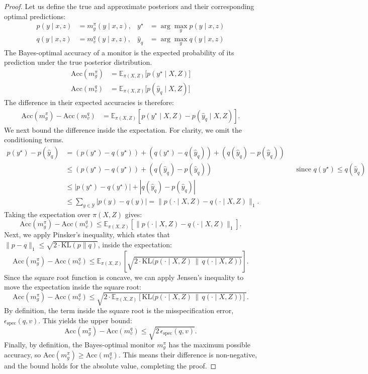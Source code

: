 \documentclass{article}
\theoremstyle{plain}
\begin{document}
\begin{proof}
Let us define the true and approximate posteriors and their corresponding optimal predictions:
\begin{align*}
p(y \mid x,z) &= m_g^{\pi}(y \mid x,z), & y^\star &= \arg\max_{y} p(y \mid x,z) \\
q(y \mid x,z) &= m_v^{q}(y \mid x,z), & \hat{y}_q &= \arg\max_{y} q(y \mid x,z)
\end{align*}
The Bayes-optimal accuracy of a monitor is the expected probability of its prediction under the true posterior distribution.
\begin{align*}
    \mathrm{Acc}(m_g^\pi) &= \mathbb{E}_{\pi(X,Z)}\big[p(y^\star \mid X,Z)\big] \\
    \mathrm{Acc}(m_v^q) &= \mathbb{E}_{\pi(X,Z)}\big[p(\hat{y}_q \mid X,Z)\big]
\end{align*}
The difference in their expected accuracies is therefore:
\begin{align*}
\mathrm{Acc}(m_g^{\pi}) - \mathrm{Acc}(m_v^q) &= \mathbb{E}_{\pi(X,Z)} \left[ p(y^\star\mid X,Z) - p(\hat{y}_q \mid X,Z) \right].
\end{align*}
We next bound the difference inside the expectation. For clarity, we omit the conditioning terms.
\begin{align*}
p(y^\star) - p(\hat{y}_q) &= \left( p(y^\star) - q(y^\star) \right) + \left( q(y^\star) - q(\hat{y}_q) \right) + \left( q(\hat{y}_q) - p(\hat{y}_q) \right) \\
&\le \left( p(y^\star) - q(y^\star) \right) + \left( q(\hat{y}_q) - p(\hat{y}_q) \right) && \text{since } q(y^\star) \le q(\hat{y}_q) \\
&\le |p(y^\star) - q(y^\star)| + |q(\hat{y}_q) - p(\hat{y}_q)| && \\
&\le \sum_{y \in \mathcal{Y}} |p(y) - q(y)| = \| p(\cdot \mid X,Z) - q(\cdot \mid X,Z) \|_1.
\end{align*}
Taking the expectation over $\pi(X,Z)$ gives:
\[
\mathrm{Acc}(m_g^{\pi}) - \mathrm{Acc}(m_v^q) \le \mathbb{E}_{\pi(X,Z)} \left[ \| p(\cdot \mid X,Z) - q(\cdot \mid X,Z) \|_1 \right].
\]
Next, we apply Pinsker's inequality, which states that $\|p-q\|_1 \le \sqrt{2 \cdot \mathrm{KL}(p\|q)}$, inside the expectation:
\[
\mathrm{Acc}(m_g^{\pi}) - \mathrm{Acc}(m_v^q)
\le \mathbb{E}_{\pi(X,Z)} \left[ \sqrt{2 \cdot \mathrm{KL}\big(p(\cdot \mid X,Z) \,\|\, q(\cdot \mid X,Z)\big)} \right].
\]
Since the square root function is concave, we can apply Jensen's inequality to move the expectation inside the square root:
\[
\mathrm{Acc}(m_g^{\pi}) - \mathrm{Acc}(m_v^q)
\le \sqrt{2 \cdot \mathbb{E}_{\pi(X,Z)} \left[ \mathrm{KL}\big(p(\cdot \mid X,Z) \,\|\, q(\cdot \mid X,Z)\big) \right]}.
\]
By definition, the term inside the square root is the misspecification error, $\epsilon_{\mathrm{spec}}(q,v)$. This yields the upper bound:
\[
\mathrm{Acc}(m_g^{\pi}) - \mathrm{Acc}(m_v^q) \le \sqrt{2\,\epsilon_{\mathrm{spec}}(q,v)}.
\]
Finally, by definition, the Bayes-optimal monitor $m_g^{\pi}$ has the maximum possible accuracy, so $\mathrm{Acc}(m_g^{\pi}) \ge \mathrm{Acc}(m_v^q)$. This means their difference is non-negative, and the bound holds for the absolute value, completing the proof.
\end{proof}
\end{document}
